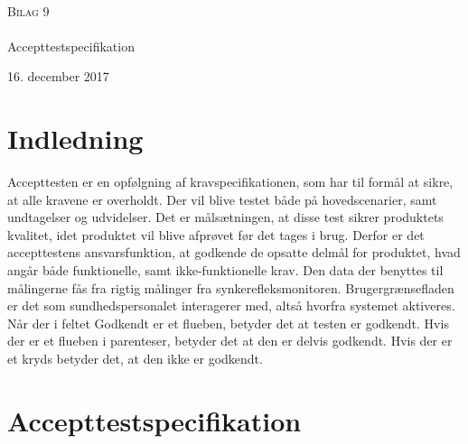\documentclass[main.tex]{subfiles}
\begin{document}
\begin{titlingpage}
\begin{center}

~ \\[3cm]


\textsc{\LARGE Bilag 9}\\[1.5cm]


\noindent\makebox[\linewidth]{\rule{\textwidth}{0.4pt}}\\
[0.5cm]{\Huge Accepttestspecifikation}
\noindent\makebox[\linewidth]{\rule{\textwidth}{0.4pt}}
\end{center}
\vfill
\begin{center}
{\large 16. december 2017}
\end{center}
\end{titlingpage}

\newpage
\tableofcontents*


\chapter{Indledning}
Accepttesten er en opfølgning af kravspecifikationen, som har til formål at sikre, at alle kravene er overholdt. Der vil blive testet både på hovedscenarier, samt undtagelser og udvidelser. Det er målsætningen, at disse test sikrer produktets kvalitet, idet produktet vil blive afprøvet før det tages i brug. Derfor er det accepttestens ansvarsfunktion, at godkende de opsatte delmål for produktet, hvad angår både funktionelle, samt ikke-funktionelle krav.
Den data der benyttes til målingerne fås fra rigtig målinger fra synkerefleksmonitoren. Brugergrænsefladen er det som sundhedspersonalet interagerer med, altså hvorfra systemet
aktiveres. Når der i feltet Godkendt er et flueben, betyder det at testen er godkendt. Hvis der er et flueben i parenteser, betyder det at den er delvis godkendt. Hvis der er et kryds betyder
det, at den ikke er godkendt.










\chapter{Accepttestspecifikation}
\end{document}
